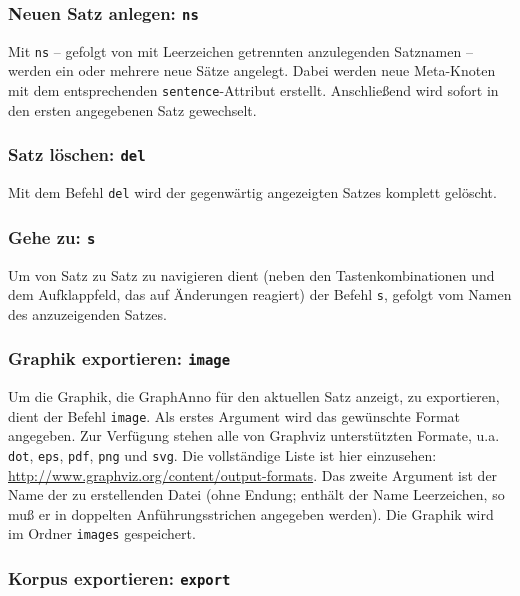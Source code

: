\documentclass[12pt]{scrartcl}
\begin{document}
\subsubsection{Neuen Satz anlegen: \texttt{ns}}\label{befehl-ns}

Mit \texttt{ns} – gefolgt von mit Leerzeichen getrennten anzulegenden Satznamen – werden ein oder mehrere neue Sätze angelegt. Dabei werden neue Meta-Knoten mit dem entsprechenden \texttt{sentence}-Attribut erstellt. Anschließend wird sofort in den ersten angegebenen Satz gewechselt.


\subsubsection{Satz löschen: \texttt{del}}

Mit dem Befehl \texttt{del} wird der gegenwärtig angezeigten Satzes komplett gelöscht.


\subsubsection{Gehe zu: \texttt{s}}

Um von Satz zu Satz zu navigieren dient (neben den Tastenkombinationen und dem Aufklappfeld, das auf Änderungen reagiert) der Befehl \texttt{s}, gefolgt vom Namen des anzuzeigenden Satzes.


\subsubsection{Graphik exportieren: \texttt{image}}

Um die Graphik, die GraphAnno für den aktuellen Satz anzeigt, zu exportieren, dient der Befehl \texttt{image}. Als erstes Argument wird das gewünschte Format angegeben. Zur Verfügung stehen alle von Graphviz unterstützten Formate, u.a. \texttt{dot}, \texttt{eps}, \texttt{pdf}, \texttt{png} und \texttt{svg}. Die vollständige Liste ist hier einzusehen: \url{http://www.graphviz.org/content/output-formats}. Das zweite Argument ist der Name der zu erstellenden Datei (ohne Endung; enthält der Name Leerzeichen, so muß er in doppelten Anführungsstrichen angegeben werden). Die Graphik wird im Ordner \texttt{images} gespeichert.


\subsubsection{Korpus exportieren: \texttt{export}}
\end{document}
